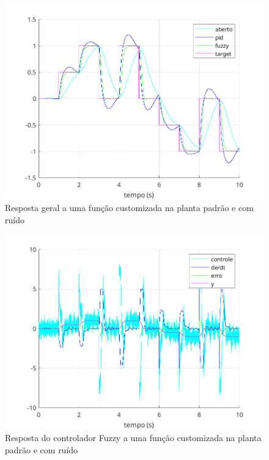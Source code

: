 \documentclass[12pt]{article}
\begin{document}
\begin{figure}
    \centering
    \includegraphics{fig/custom_ruido.png}
    \caption{Resposta geral a uma função customizada na planta padrão e com ruído}
\end{figure}

\begin{figure}
    \centering
    \includegraphics{fig/custom_ruido_fuzzy.png}
    \caption{Resposta do controlador Fuzzy a uma função customizada na planta padrão e com ruído}
\end{figure}
\end{document}

